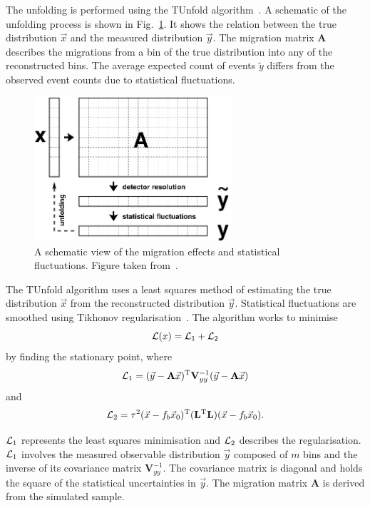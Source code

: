 The unfolding is performed using the TUnfold algorithm~\cite{Unfold:TUnfold}. 
A schematic of the unfolding process is shown in Fig.~\ref{fig:migration}.
It shows the relation between the true distribution $\vec{x}$ and the measured distribution $\vec{y}$.
The migration matrix $\mathbf{A}$ describes the migrations from a bin of the true distribution into any of the reconstructed bins.
The average expected count of events $\widetilde{y}$ differs from the observed event counts due to statistical fluctuations.
\begin{figure}[htpb]
	\centering
	\includegraphics[width=0.65\textwidth]{Figures/Unfold_TUnfold.png}
	\caption[A schematic view of the migration effects and statistical fluctuations.]{A schematic view of the migration effects and statistical fluctuations. Figure taken from~\cite{Unfold:TUnfold}.}
	\label{fig:migration}
\end{figure}

The TUnfold algorithm uses a least squares method of estimating the true distribution $\vec{x}$ from the reconstructed distribution $\vec{y}$.
Statistical fluctuations are smoothed using Tikhonov regularisation~\cite{Unfold:Tikh1, Unfold:Tikh2}. 
The algorithm works to minimise 
\begin{equation*}
\mathcal{L}(x) = \mathcal{L}_{1}+\mathcal{L}_{2}
\end{equation*}
by finding the stationary point, where
\begin{equation*}
\mathcal{L}_{1} = (\vec{y}-\mathbf{A}\vec{x})^{\mathrm{T}} \mathbf{V}_{yy}^{-1} (\vec{y}-\mathbf{A}\vec{x})
\end{equation*}
and
\begin{equation*}
\mathcal{L}_{2} = \tau^{2}(\vec{x}-f_{b}\vec{x}_{0})^{\mathrm{T}} (\mathbf{L}^{\mathrm{T}}\mathbf{L}) (\vec{x}-f_{b}\vec{x}_{0}).
\end{equation*}

$\mathcal{L}_{1}$ represents the least squares minimisation and $\mathcal{L}_{2}$ describes the regularisation. 
$\mathcal{L}_{1}$ involves the measured observable distribution $\vec{y}$ composed of $m$ bins and the inverse of its covariance matrix $\mathbf{V}_{yy}^{-1}$.
The covariance matrix is diagonal and holds the square of the statistical uncertainties in $\vec{y}$.
The migration matrix $\mathbf{A}$ is derived from the simulated \powhegpythia{} sample.

